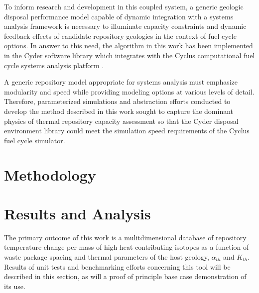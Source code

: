\documentclass{anstrans}
\begin{document}
To inform research and development in this coupled system, a generic geologic disposal 
performance model capable of dynamic integration with a systems analysis 
framework is necessary to illuminate capacity constraints and dynamic feedback 
effects of candidate repository geologies in the context of fuel cycle options.
In answer to this need, the algorithm in this work has been implemented in the 
Cyder software library which integrates with the Cyclus computational 
fuel cycle systems analysis platform \cite{huff_cyder_2013,wilson_cyclus:_2012}. 

A generic repository model appropriate for systems analysis must emphasize 
modularity and speed while providing modeling options at various levels of 
detail. Therefore, parameterized simulations and abstraction efforts conducted to develop 
the method described in this work sought to capture the dominant physics of 
thermal repository capacity assessment so that the Cyder disposal environment 
library could meet the simulation speed requirements of the Cyclus fuel cycle 
simulator.

\section{Methodology}









\section{Results and Analysis}

The primary outcome of this work is a mulitdimensional database of repository temperature 
change per mass of high heat contributing isotopes as a function of waste
package spacing and thermal parameters of the host geology, $\alpha_{th}$ and $K_{th}$. 
Results of unit tests and benchmarking efforts concerning this tool will be described in this 
section, as will a proof of principle base case demonstration of its use. 
\end{document}
